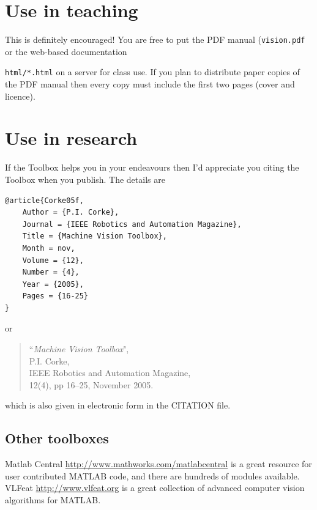 \documentclass[a4paper]{report}
\begin{document}
\section{Use in teaching}
This is definitely encouraged!
You are free to put the PDF manual (\texttt{vision.pdf} or the web-based documentation {\texttt{html/*.html} on a server for class
use.
If you plan to distribute paper copies of the PDF manual then every copy must include the first two pages (cover and licence).

\section{Use in research}
If the Toolbox helps you in your endeavours then I'd appreciate you citing the Toolbox when you publish.
The details are
\begin{verbatim}
@article{Corke05f,
    Author = {P.I. Corke},
    Journal = {IEEE Robotics and Automation Magazine},
    Title = {Machine Vision Toolbox},
    Month = nov,
    Volume = {12},
    Number = {4},
    Year = {2005},
    Pages = {16-25}
}
\end{verbatim}
or
\begin{quote}
``\textit{Machine Vision Toolbox}",\\
P.I. Corke, \\
IEEE Robotics and Automation Magazine, \\
12(4), pp 16--25, November 2005.
\end{quote}
which is also given in electronic form in the CITATION file.


\subsection{Other toolboxes}
Matlab Central \url{http://www.mathworks.com/matlabcentral} is a great resource for user contributed MATLAB code, and there are hundreds of modules available.
VLFeat \url{http://www.vlfeat.org} is a great collection of advanced computer vision algorithms for MATLAB.

}
\end{document}

